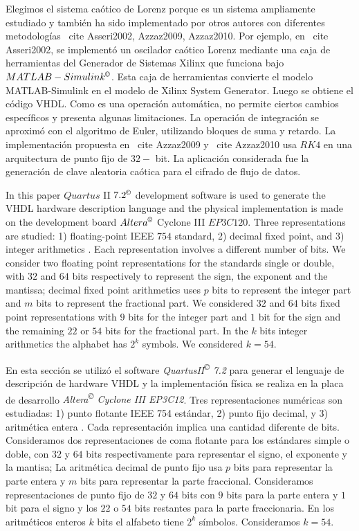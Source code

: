 Elegimos el sistema caótico de Lorenz porque es un sistema ampliamente estudiado y también ha sido implementado por otros autores con diferentes metodologías \ cite {Asseri2002, Azzaz2009, Azzaz2010}.
Por ejemplo, en \ cite {Asseri2002}, se implementó un oscilador caótico Lorenz mediante una caja de herramientas del Generador de Sistemas Xilinx que funciona bajo $ MATLAB-Simulink ^\copyright $.
Esta caja de herramientas convierte el modelo MATLAB-Simulink en el modelo de Xilinx System Generator.
Luego se obtiene el código VHDL.
Como es una operación automática, no permite ciertos cambios específicos y presenta algunas limitaciones.
La operación de integración se aproximó con el algoritmo de Euler, utilizando bloques de suma y retardo. La implementación propuesta en \ cite {Azzaz2009} y \ cite {Azzaz2010} usa $ RK4 $ en una arquitectura de punto fijo de $ 32- $ bit.
La aplicación considerada fue la generación de clave aleatoria caótica para el cifrado de flujo de datos.

In this paper $Quartus$ II $7.2^\copyright$ development software is used to generate the VHDL hardware description language and the physical implementation is made on the development board $Altera^\copyright$ Cyclone III $EP3C120$.
Three representations are studied:
1)  floating-point IEEE $754$ standard,
2) decimal fixed point, and 
3) integer arithmetics \cite{Gonzalez2003}.
Each representation involves a different number of bits.
We consider two floating point representations for the standards single or double, with $32$ and $64$ bits respectively to represent the sign, the exponent and the mantissa;
decimal fixed point arithmetics uses $p$ bits to represent the integer part and $m$ bits to represent the fractional part.
We considered $32$ and $64$ bits fixed point representations with $9$ bits for the integer part and $1$ bit for the sign and the remaining $22$ or $54$ bits for the fractional part.
In the $k$ bits integer arithmetics the alphabet has $2^k$ symbols.
We considered $k=54$.

En esta sección se utilizó el software \textit{QuartusII\textsuperscript{\copyright} 7.2} para generar el lenguaje de descripción de hardware VHDL y la implementación física se realiza en la placa de desarrollo \textit{Altera\textsuperscript{\copyright} Cyclone III EP3C12}.
Tres representaciones numéricas son estudiadas:
1) punto flotante IEEE 754 estándar,
2) punto fijo decimal, y
3) aritmética entera \cite{Gonzalez2003}.
Cada representación implica una cantidad diferente de bits.
Consideramos dos representaciones de coma flotante para los estándares simple o doble, con $32$ y $64$ bits respectivamente para representar el signo, el exponente y la mantisa;
La aritmética decimal de punto fijo usa $p$ bits para representar la parte entera y $m$ bits para representar la parte fraccional.
Consideramos representaciones de punto fijo de $32$ y $64$ bits con $9$ bits para la parte entera y $1$ bit para el signo y los $22$ o $54$ bits restantes para la parte fraccionaria.
En los aritméticos enteros $k$ bits el alfabeto tiene $2^k$ símbolos.
Consideramos $k=54$.

